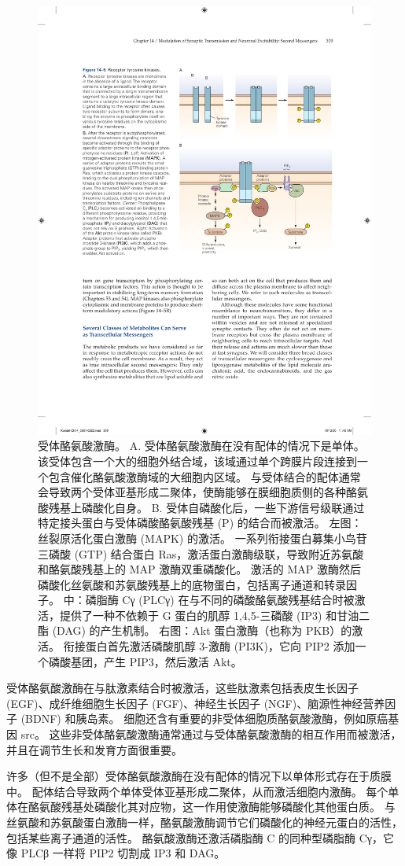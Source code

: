 \begin{figure}[htbp]
	\centering
	\includegraphics[width=0.7\linewidth]{chap14/fig_14_5}
	\caption{受体酪氨酸激酶。 A. 受体酪氨酸激酶在没有配体的情况下是单体。 该受体包含一个大的细胞外结合域，该域通过单个跨膜片段连接到一个包含催化酪氨酸激酶域的大细胞内区域。 与受体结合的配体通常会导致两个受体亚基形成二聚体，使酶能够在膜细胞质侧的各种酪氨酸残基上磷酸化自身。 B. 受体自磷酸化后，一些下游信号级联通过特定接头蛋白与受体磷酸酪氨酸残基 (P) 的结合而被激活。 左图：丝裂原活化蛋白激酶 (MAPK) 的激活。 一系列衔接蛋白募集小鸟苷三磷酸 (GTP) 结合蛋白 Ras，激活蛋白激酶级联，导致附近苏氨酸和酪氨酸残基上的 MAP 激酶双重磷酸化。 激活的 MAP 激酶然后磷酸化丝氨酸和苏氨酸残基上的底物蛋白，包括离子通道和转录因子。 中：磷脂酶 Cγ (PLCγ) 在与不同的磷酸酪氨酸残基结合时被激活，提供了一种不依赖于 G 蛋白的肌醇 1,4,5-三磷酸 (IP3) 和甘油二酯 (DAG) 的产生机制。 右图：Akt 蛋白激酶（也称为 PKB）的激活。 衔接蛋白首先激活磷酸肌醇 3-激酶 (PI3K)，它向 PIP2 添加一个磷酸基团，产生 PIP3，然后激活 Akt。}
	\label{fig:14_5}
\end{figure}


受体酪氨酸激酶在与肽激素结合时被激活，这些肽激素包括表皮生长因子 (EGF)、成纤维细胞生长因子 (FGF)、神经生长因子 (NGF)、脑源性神经营养因子 (BDNF) 和胰岛素。
细胞还含有重要的非受体细胞质酪氨酸激酶，例如原癌基因 src。
这些非受体酪氨酸激酶通常通过与受体酪氨酸激酶的相互作用而被激活，并且在调节生长和发育方面很重要。


许多（但不是全部）受体酪氨酸激酶在没有配体的情况下以单体形式存在于质膜中。
配体结合导致两个单体受体亚基形成二聚体，从而激活细胞内激酶。
每个单体在酪氨酸残基处磷酸化其对应物，这一作用使激酶能够磷酸化其他蛋白质。
与丝氨酸和苏氨酸蛋白激酶一样，酪氨酸激酶调节它们磷酸化的神经元蛋白的活性，包括某些离子通道的活性。
酪氨酸激酶还激活磷脂酶 C 的同种型磷脂酶 Cγ，它像 PLCβ 一样将 PIP2 切割成 IP3 和 DAG。


